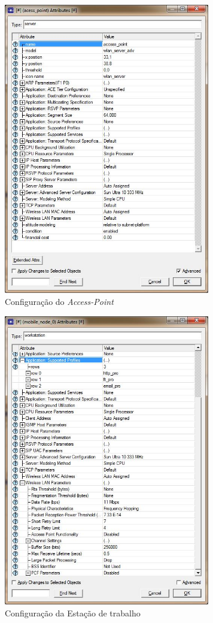 \documentclass[brazil,times,12pt]{abnt}
\begin{document}
\begin{figure}[htp]
\begin{center}
  \includegraphics[width=90mm]{SimulacaoRede/AccessPointConf.jpg}
  \caption[access-point-conf]{Configuração do \emph{Access-Point}}
  \label{access-point-conf}
\end{center}
\end{figure}

\begin{figure}[htp]
\begin{center}
  \includegraphics[width=90mm]{SimulacaoRede/WorkstationConf.jpg}
  \caption[workstation-conf]{Configuração da Estação de trabalho}
  \label{workstation-conf}
\end{center}
\end{figure}
\end{document}
